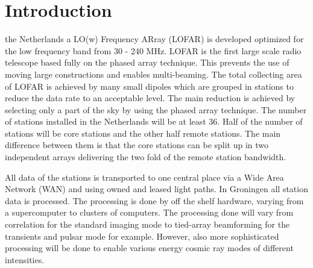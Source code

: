 \documentclass[journal]{IEEEtran}
\begin{document}
\section{Introduction}
% 
% 
% 
% 

 the Netherlands a LO(w) Frequency ARray (LOFAR) is developed optimized for the low frequency band from 30 - 240 MHz. LOFAR is the first large scale radio telescope based fully on the phased array technique. This prevents the use of moving large constructions and enables multi-beaming. The total collecting area of LOFAR is achieved by many small dipoles which are grouped in stations to reduce the data rate to an acceptable level. The main reduction is achieved by selecting only a part of the sky by using the phased array technique. The number of stations installed in the Netherlands will be at least 36. Half of the number of stations will be core stations and the other half remote stations. The main difference between them is that the core stations can be split up in two independent arrays delivering the two fold of the remote station bandwidth.

All data of the stations is transported to one central place via a Wide Area Network (WAN) and using owned and leased light paths. In Groningen all station data is processed. The processing is done by off the shelf hardware, varying from a supercomputer to clusters of computers. The processing done will vary from correlation for the standard imaging mode to tied-array beamforming for the transients and pulsar mode for example. However, also more sophisticated processing will be done to enable various energy cosmic ray modes of different intensities. 
\end{document}
